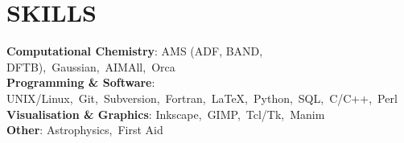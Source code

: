 \section{SKILLS}
\begin{itemize}[leftmargin=0in, label={}]
  \small{\item{
    \textbf{Computational Chemistry}\hspace{2pt}:\hspace{4pt}%
      AMS (ADF, BAND, DFTB),\ Gaussian,\ AIMAll,\ Orca
      \vspace{2pt}\\
    \textbf{Programming \& Software}\hspace{2pt}:\hspace{4pt}%
      UNIX/Linux,\ Git,\ Subversion,\ Fortran,\ \LaTeX,\ Python,\ SQL,\ C/C++,\ Perl
      \vspace{2pt}\\
    \textbf{Visualisation \& Graphics}\hspace{2pt}:\hspace{4pt}%
      Inkscape,\ GIMP,\ Tcl/Tk,\ Manim
      \vspace{2pt}\\
    \textbf{Other}\hspace{2pt}:\hspace{4pt}%
      Astrophysics,\ First Aid
  }}
\end{itemize}
